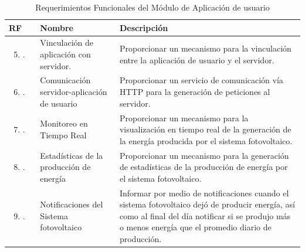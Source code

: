 \begin{longtable}{|M{1.6cm}|M{4.0cm}|M{6.0cm}|}
    \caption{Requerimientos Funcionales del Módulo de Aplicación de usuario}
	\hline
	\textbf{RF} & \textbf{Nombre} & \textbf{Descripción} \\
	\hline
 	\begin{enumerate}[label=RF\arabic*]
 	    \setcounter{enumi}{4}
 	    \item.
 	\end{enumerate}
 	& Vinculación de aplicación con servidor.
 	& Proporcionar un mecanismo para la vinculación entre la aplicación de usuario y el servidor.\\
    \hline
    \begin{enumerate}[label=RF\arabic*]
        \setcounter{enumi}{5}
 	    \item.
 	\end{enumerate}
 	& Comunicación servidor-aplicación de usuario 
 	& Proporcionar un servicio de comunicación vía HTTP para la generación de peticiones al servidor. \\
    \hline
    \begin{enumerate}[label=RF\arabic*]
        \setcounter{enumi}{6}
 	    \item.
 	\end{enumerate}
 	& Monitoreo en Tiempo Real 
 	& Proporcionar un mecanismo para la visualización en tiempo real de la generación  de la energía producida por el sistema fotovoltaico. \\
    \hline
    \begin{enumerate}[label=RF\arabic*]
        \setcounter{enumi}{7}
 	    \item.
 	\end{enumerate}
 	& Estadísticas de la producción de energía 
 	& Proporcionar un mecanismo para la generación de estadísticas de la producción de energía por el sistema fotovoltaico. \\
    \hline
    \begin{enumerate}[label=RF\arabic*]
        \setcounter{enumi}{8}
 	    \item.
 	\end{enumerate}
 	& Notificaciones del Sistema fotovoltaico 
 	& Informar por medio de notificaciones cuando el sistema fotovoltaico dejó de producir energía, así como al final del día notificar si se produjo más o menos energía que el promedio diario de producción. \\
    \hline
\end{longtable}